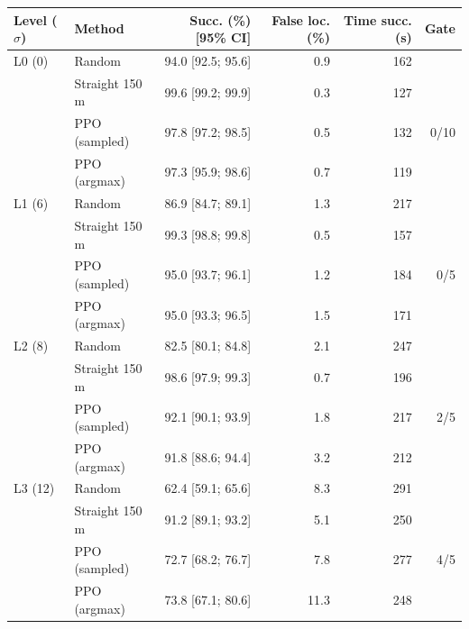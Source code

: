 \begin{tabular}{@{}llrrrr@{}}
\toprule
Level ($\sigma$) & Method & Succ. (\%) [95\% CI] & False loc. (\%) & Time succ. (s) & Gate \\
\midrule
L0 (0) & Random & 94.0 [92.5; 95.6] & 0.9 & 162 &  \\
 & Straight 150\,m & 99.6 [99.2; 99.9] & 0.3 & 127 &  \\
 & PPO (sampled) & 97.8 [97.2; 98.5] & 0.5 & 132 & 0/10 \\
 & PPO (argmax) & 97.3 [95.9; 98.6] & 0.7 & 119 &  \\
\midrule
L1 (6) & Random & 86.9 [84.7; 89.1] & 1.3 & 217 &  \\
 & Straight 150\,m & 99.3 [98.8; 99.8] & 0.5 & 157 &  \\
 & PPO (sampled) & 95.0 [93.7; 96.1] & 1.2 & 184 & 0/5 \\
 & PPO (argmax) & 95.0 [93.3; 96.5] & 1.5 & 171 &  \\
\midrule
L2 (8) & Random & 82.5 [80.1; 84.8] & 2.1 & 247 &  \\
 & Straight 150\,m & 98.6 [97.9; 99.3] & 0.7 & 196 &  \\
 & PPO (sampled) & 92.1 [90.1; 93.9] & 1.8 & 217 & 2/5 \\
 & PPO (argmax) & 91.8 [88.6; 94.4] & 3.2 & 212 &  \\
\midrule
L3 (12) & Random & 62.4 [59.1; 65.6] & 8.3 & 291 &  \\
 & Straight 150\,m & 91.2 [89.1; 93.2] & 5.1 & 250 &  \\
 & PPO (sampled) & 72.7 [68.2; 76.7] & 7.8 & 277 & 4/5 \\
 & PPO (argmax) & 73.8 [67.1; 80.6] & 11.3 & 248 &  \\
\bottomrule
\end{tabular}
